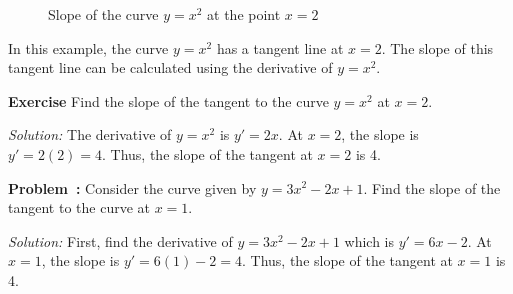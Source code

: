 \documentclass[a4paper,12pt]{book}
\newenvironment{exercise}[1][]
  {\par\medskip\noindent\textbf{Exercise #1} \rmfamily}
  {\medskip}
\newcounter{problem}
\newenvironment{problem}[1][\theproblem]
{\refstepcounter{problem}\par\medskip\noindent\textbf{Problem~#1:} \rmfamily}{\medskip}
\newenvironment{solution}[1][]
{\par\noindent\textit{Solution:} \rmfamily}{\medskip}
\begin{document}
\begin{figure}[H]
\centering
{}
\caption{Slope of the curve \(y = x^2\) at the point \(x=2\)}
\end{figure}

In this example, the curve \(y = x^2\) has a tangent line at \(x=2\). The slope of this tangent line can be calculated using the derivative of \(y = x^2\).

\begin{exercise}
Find the slope of the tangent to the curve \(y = x^2\) at \(x=2\).
\end{exercise}

\begin{solution}
The derivative of \(y = x^2\) is \(y' = 2x\). At \(x=2\), the slope is \(y' = 2(2) = 4\). Thus, the slope of the tangent at \(x=2\) is 4.
\end{solution}





\begin{problem}
Consider the curve given by \( y = 3x^2 - 2x + 1 \). Find the slope of the tangent to the curve at \( x = 1 \).
\end{problem}

\begin{solution}
First, find the derivative of \( y = 3x^2 - 2x + 1 \) which is \( y' = 6x - 2 \). At \( x = 1 \), the slope is \( y' = 6(1) - 2 = 4 \). Thus, the slope of the tangent at \( x = 1 \) is 4.
\end{solution}
\end{document}
